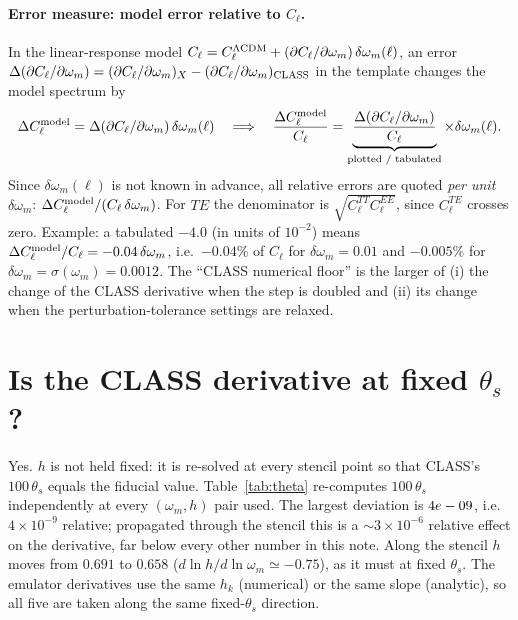 \documentclass[10pt]{article}
\newcommand{\om}{\omega_m}
\newcommand{\dC}{\partial C_\ell/\partial\om}
\begin{document}
\paragraph{Error measure: model error relative to $C_\ell$.}
In the linear-response model $C_\ell=C_\ell^{\Lambda\rm CDM}+(\dC)\,\delta\om(\ell)$, an error
$\Delta(\dC)=(\dC)_X-(\dC)_{\rm CLASS}$ in the template changes the model spectrum by
\begin{equation}
  \Delta C_\ell^{\rm model}=\Delta(\dC)\,\delta\om(\ell)
  \quad\Longrightarrow\quad
  \frac{\Delta C_\ell^{\rm model}}{C_\ell}=\underbrace{\frac{\Delta(\dC)}{C_\ell}}_{\text{plotted / tabulated}}\times\delta\om(\ell).
\end{equation}
Since $\delta\om(\ell)$ is not known in advance, all relative errors are quoted \emph{per unit} $\delta\om$:
$\Delta C_\ell^{\rm model}/(C_\ell\,\delta\om)$. For $TE$ the denominator is $\sqrt{C_\ell^{TT}C_\ell^{EE}}$, since
$C_\ell^{TE}$ crosses zero. Example: a tabulated $-4.0$ (in units of $10^{-2}$) means
$\Delta C_\ell^{\rm model}/C_\ell=-0.04\,\delta\om$, i.e.\ $-0.04\%$ of $C_\ell$ for $\delta\om=0.01$ and
$-0.005\%$ for $\delta\om=\sigma(\om)=0.0012$. The ``CLASS numerical floor'' is the larger of (i) the change of the CLASS derivative
when the step is doubled and (ii) its change when the perturbation-tolerance settings are relaxed.

\section{Is the CLASS derivative at fixed $\theta_s$?}

Yes. $h$ is not held fixed: it is re-solved at every stencil point so that CLASS's $100\,\theta_s$ equals the fiducial
value. Table~\ref{tab:theta} re-computes $100\,\theta_s$ independently at every $(\om,h)$ pair used. The largest
deviation is $4e-09$, i.e.\ $4\times10^{-9}$ relative; propagated through the stencil this is a
$\sim3\times10^{-6}$ relative effect on the derivative, far below every other number in this note. Along the
stencil $h$ moves from $0.691$ to $0.658$ ($d\ln h/d\ln\om\simeq-0.75$), as it must at fixed $\theta_s$.
The emulator derivatives use the same $h_k$ (numerical) or the same slope (analytic), so all five are taken
along the same fixed-$\theta_s$ direction.

\begin{table}[H]
\centering
\caption{CLASS stencil points ($\om=\omega_b+\omega_{\rm cdm}+\omega_\nu$, $\epsilon=\eps$) and CLASS's
$100\,\theta_s$ re-evaluated at each of them. $k=\pm4$ are used only for the step-size check.}
\label{tab:theta}

\end{table}
\end{document}
